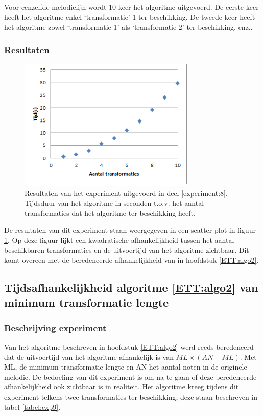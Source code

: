 Voor eenzelfde melodielijn wordt 10 keer het algoritme uitgevoerd. De eerste keer heeft het algoritme enkel `transformatie' 1 ter beschikking. De tweede keer heeft het algoritme zowel `transformatie 1' als `transformatie 2' ter beschikking, enz..

\subsubsection{Resultaten}
\begin{figure}[!ht]
  \centering
  \includegraphics[width=0.75\textwidth]{5_Experimenten_Resultaten/exp8_res}
  \caption{Resultaten van het experiment uitgevoerd in deel \ref{experiment:8}. Tijdsduur van het algoritme in seconden t.o.v. het aantal transformaties dat het algoritme ter beschikking heeft.}
  \label{figuur:exp8}
\end{figure}

De resultaten van dit experiment staan weergegeven in een scatter plot in figuur \ref{figuur:exp8}. Op deze figuur lijkt een kwadratische afhankelijkheid tussen het aantal beschikbaren transformaties en de uitvoertijd van het algoritme zichtbaar. Dit komt overeen met de beredeneerde afhankelijkheid van in hoofdstuk \ref{ETT:algo2}.

\subsection{Tijdsafhankelijkheid algoritme \ref{ETT:algo2} van minimum transformatie lengte}
\label{experiment:9}
\subsubsection{Beschrijving experiment}
Van het algoritme beschreven in hoofdstuk \ref{ETT:algo2} werd reeds beredeneerd dat de uitvoertijd van het algoritme afhankelijk is van $ML \times (AN-ML)$. Met ML, de minimum transformatie lengte en AN het aantal noten in de originele melodie. De bedoeling van dit experiment is om na te gaan of deze beredeneerde afhankelijkheid ook zichtbaar is in realiteit. Het algoritme kreeg tijdens dit experiment telkens twee transformaties ter beschikking, deze staan beschreven in tabel \ref{tabel:exp9}.

